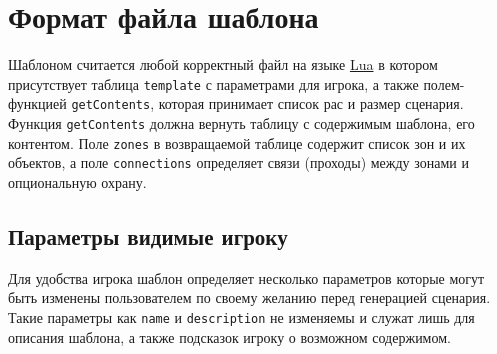 \section{Формат файла шаблона}
Шаблоном считается любой корректный файл на языке \href{https://www.lua.org/}{Lua} в котором присутствует таблица \texttt{template} с параметрами для игрока, а также полем-функцией \texttt{getContents}, которая принимает список рас и размер сценария. Функция \texttt{getContents} должна вернуть таблицу с содержимым шаблона, его контентом. Поле \texttt{zones} в возвращаемой таблице содержит список зон и их объектов, а поле \texttt{connections} определяет связи (проходы) между зонами и опциональную охрану.

\subsection{Параметры видимые игроку}
Для удобства игрока шаблон определяет несколько параметров которые могут быть изменены пользователем по своему желанию перед генерацией сценария. Такие параметры как \texttt{name} и \texttt{description} не изменяемы и служат лишь для описания шаблона, а также подсказок игроку о возможном содержимом.

